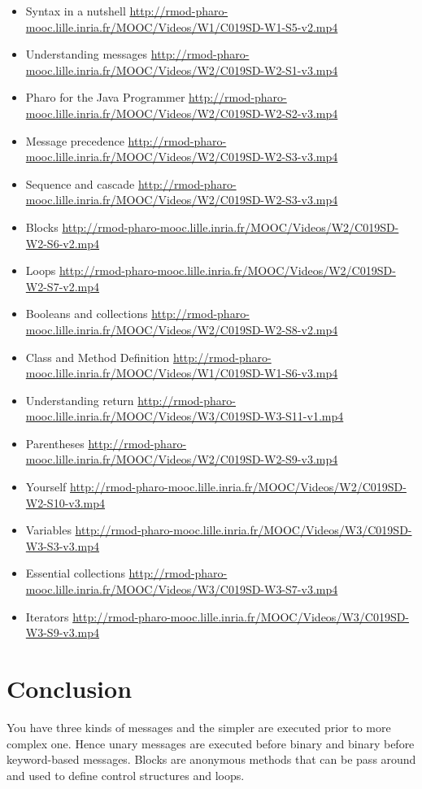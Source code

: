\documentclass[10pt,twoside,english]{_support/latex/sbabook/sbabook}
\begin{document}
\begin{itemize}
\item Syntax in a nutshell \url{http://rmod-pharo-mooc.lille.inria.fr/MOOC/Videos/W1/C019SD-W1-S5-v2.mp4}
\item Understanding messages \url{http://rmod-pharo-mooc.lille.inria.fr/MOOC/Videos/W2/C019SD-W2-S1-v3.mp4}
\item Pharo for the Java Programmer \url{http://rmod-pharo-mooc.lille.inria.fr/MOOC/Videos/W2/C019SD-W2-S2-v3.mp4}
\item Message precedence \url{http://rmod-pharo-mooc.lille.inria.fr/MOOC/Videos/W2/C019SD-W2-S3-v3.mp4}
\item Sequence and cascade \url{http://rmod-pharo-mooc.lille.inria.fr/MOOC/Videos/W2/C019SD-W2-S3-v3.mp4}
\item Blocks \url{http://rmod-pharo-mooc.lille.inria.fr/MOOC/Videos/W2/C019SD-W2-S6-v2.mp4}
\item Loops \url{http://rmod-pharo-mooc.lille.inria.fr/MOOC/Videos/W2/C019SD-W2-S7-v2.mp4}
\item Booleans and collections \url{http://rmod-pharo-mooc.lille.inria.fr/MOOC/Videos/W2/C019SD-W2-S8-v2.mp4}
\item Class and Method Definition \url{http://rmod-pharo-mooc.lille.inria.fr/MOOC/Videos/W1/C019SD-W1-S6-v3.mp4}
\item Understanding return \url{http://rmod-pharo-mooc.lille.inria.fr/MOOC/Videos/W3/C019SD-W3-S11-v1.mp4}
\item Parentheses \url{http://rmod-pharo-mooc.lille.inria.fr/MOOC/Videos/W2/C019SD-W2-S9-v3.mp4}
\item Yourself \url{http://rmod-pharo-mooc.lille.inria.fr/MOOC/Videos/W2/C019SD-W2-S10-v3.mp4}
\item Variables \url{http://rmod-pharo-mooc.lille.inria.fr/MOOC/Videos/W3/C019SD-W3-S3-v3.mp4}
\item Essential collections \url{http://rmod-pharo-mooc.lille.inria.fr/MOOC/Videos/W3/C019SD-W3-S7-v3.mp4} 
\item Iterators \url{http://rmod-pharo-mooc.lille.inria.fr/MOOC/Videos/W3/C019SD-W3-S9-v3.mp4}
\end{itemize}
\section{Conclusion }
You have three kinds of messages and the simpler are executed prior to more complex one. Hence unary messages are executed before binary and binary before keyword-based messages. 
Blocks are anonymous methods that can be pass around and used to define control structures and loops.
\end{document}
